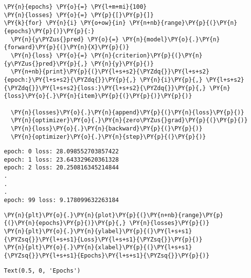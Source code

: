     \begin{tcolorbox}[breakable, size=fbox, boxrule=1pt, pad at break*=1mm,colback=cellbackground, colframe=cellborder]
\begin{Verbatim}[commandchars=\\\{\}]
\PY{n}{epochs} \PY{o}{=} \PY{l+m+mi}{100}
\PY{n}{losses} \PY{o}{=} \PY{p}{[}\PY{p}{]}
\PY{k}{for} \PY{n}{i} \PY{o+ow}{in} \PY{n+nb}{range}\PY{p}{(}\PY{n}{epochs}\PY{p}{)}\PY{p}{:}
  \PY{n}{y\PYZus{}pred} \PY{o}{=} \PY{n}{model}\PY{o}{.}\PY{n}{forward}\PY{p}{(}\PY{n}{X}\PY{p}{)}
  \PY{n}{loss} \PY{o}{=} \PY{n}{criterion}\PY{p}{(}\PY{n}{y\PYZus{}pred}\PY{p}{,} \PY{n}{y}\PY{p}{)}
  \PY{n+nb}{print}\PY{p}{(}\PY{l+s+s2}{\PYZdq{}}\PY{l+s+s2}{epoch:}\PY{l+s+s2}{\PYZdq{}}\PY{p}{,} \PY{n}{i}\PY{p}{,} \PY{l+s+s2}{\PYZdq{}}\PY{l+s+s2}{loss:}\PY{l+s+s2}{\PYZdq{}}\PY{p}{,} \PY{n}{loss}\PY{o}{.}\PY{n}{item}\PY{p}{(}\PY{p}{)}\PY{p}{)}
  
  \PY{n}{losses}\PY{o}{.}\PY{n}{append}\PY{p}{(}\PY{n}{loss}\PY{p}{)}
  \PY{n}{optimizer}\PY{o}{.}\PY{n}{zero\PYZus{}grad}\PY{p}{(}\PY{p}{)}
  \PY{n}{loss}\PY{o}{.}\PY{n}{backward}\PY{p}{(}\PY{p}{)}
  \PY{n}{optimizer}\PY{o}{.}\PY{n}{step}\PY{p}{(}\PY{p}{)}
\end{Verbatim}
\end{tcolorbox}

    \begin{Verbatim}[commandchars=\\\{\}]
epoch: 0 loss: 28.098552703857422
epoch: 1 loss: 23.643329620361328
epoch: 2 loss: 20.250816345214844
.
.
.
epoch: 99 loss: 9.178099632263184
    \end{Verbatim}

    \begin{tcolorbox}[breakable, size=fbox, boxrule=1pt, pad at break*=1mm,colback=cellbackground, colframe=cellborder]
\begin{Verbatim}[commandchars=\\\{\}]
\PY{n}{plt}\PY{o}{.}\PY{n}{plot}\PY{p}{(}\PY{n+nb}{range}\PY{p}{(}\PY{n}{epochs}\PY{p}{)}\PY{p}{,} \PY{n}{losses}\PY{p}{)}
\PY{n}{plt}\PY{o}{.}\PY{n}{ylabel}\PY{p}{(}\PY{l+s+s1}{\PYZsq{}}\PY{l+s+s1}{Loss}\PY{l+s+s1}{\PYZsq{}}\PY{p}{)}
\PY{n}{plt}\PY{o}{.}\PY{n}{xlabel}\PY{p}{(}\PY{l+s+s1}{\PYZsq{}}\PY{l+s+s1}{Epochs}\PY{l+s+s1}{\PYZsq{}}\PY{p}{)}
\end{Verbatim}
\end{tcolorbox}

            \begin{tcolorbox}[breakable, size=fbox, boxrule=.5pt, pad at break*=1mm, opacityfill=0]
\begin{Verbatim}[commandchars=\\\{\}]
Text(0.5, 0, 'Epochs')
\end{Verbatim}
\end{tcolorbox}
        
